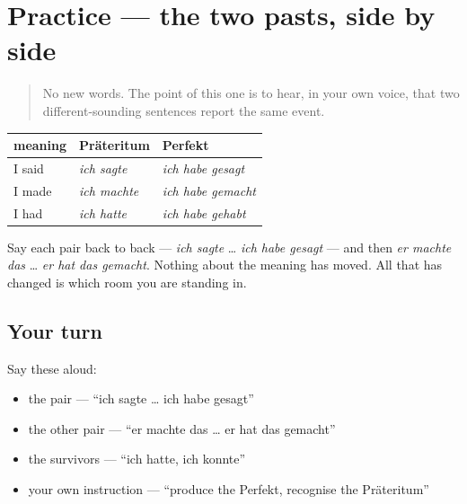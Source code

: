 \section[Practice]{Practice — the two pasts, side by side}

\label{lesson:GE-C15-praeteritum-practice}



\begin{quote}
No new words. The point of this one is to hear, in your own voice, that two different-sounding sentences report the same event.
\end{quote}

\begin{grammarlens}[title={Grammar Lens: one meaning, two shapes}]
\noindent
\begin{tabularx}{\linewidth}{@{}>{\raggedright\arraybackslash}X>{\raggedright\arraybackslash}X>{\raggedright\arraybackslash}X@{}}
\toprule
\textbf{meaning} & \textbf{Präteritum} & \textbf{Perfekt} \\
\midrule
I said & \emph{ich sagte} & \emph{ich habe gesagt} \\
I made & \emph{ich machte} & \emph{ich habe gemacht} \\
I had & \emph{ich hatte} & \emph{ich habe gehabt} \\
\bottomrule
\end{tabularx}

Say each pair back to back — \emph{ich sagte} … \emph{ich habe gesagt} — and then \emph{er machte das} … \emph{er hat das gemacht}. Nothing about the meaning has moved. All that has changed is which room you are standing in.
\end{grammarlens}

\subsection*{Your turn}
Say these aloud:

\begin{itemize}
\raggedright
  \item the pair — \textquotedblleft{}ich sagte … ich habe gesagt\textquotedblright{}
  \item the other pair — \textquotedblleft{}er machte das … er hat das gemacht\textquotedblright{}
  \item the survivors — \textquotedblleft{}ich hatte, ich konnte\textquotedblright{}
  \item your own instruction — \textquotedblleft{}produce the Perfekt, recognise the Präteritum\textquotedblright{}
\end{itemize}

